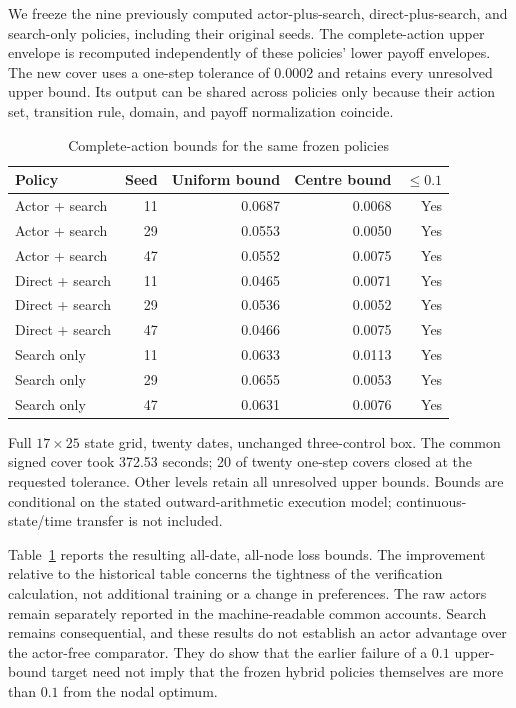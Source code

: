 \documentclass[ecta,nameyear,draft]{econsocart}
\theoremstyle{definition}
\theoremstyle{remark}
\begin{document}
We freeze the nine previously computed actor-plus-search, direct-plus-search, and search-only policies, including their original seeds. The complete-action upper envelope is recomputed independently of these policies' lower payoff envelopes. The new cover uses a one-step tolerance of $0.0002$ and retains every unresolved upper bound. Its output can be shared across policies only because their action set, transition rule, domain, and payoff normalization coincide.

\begin{table}[htbp]
\centering\small\setlength{\tabcolsep}{4pt}
\caption{Complete-action bounds for the same frozen policies}\label{tab:r9common}
\begin{tabular}{lrrrr}
\toprule
Policy & Seed & Uniform bound & Centre bound & $\leq0.1$ \\
\midrule
Actor + search & 11 & 0.0687 & 0.0068 & Yes \\
Actor + search & 29 & 0.0553 & 0.0050 & Yes \\
Actor + search & 47 & 0.0552 & 0.0075 & Yes \\
Direct + search & 11 & 0.0465 & 0.0071 & Yes \\
Direct + search & 29 & 0.0536 & 0.0052 & Yes \\
Direct + search & 47 & 0.0466 & 0.0075 & Yes \\
Search only & 11 & 0.0633 & 0.0113 & Yes \\
Search only & 29 & 0.0655 & 0.0053 & Yes \\
Search only & 47 & 0.0631 & 0.0076 & Yes \\
\bottomrule
\end{tabular}
\par\vspace{3pt}\begin{minipage}{0.97\linewidth}\footnotesize Full $17\times25$ state grid, twenty dates, unchanged three-control box. The common signed cover took 372.53 seconds; 20 of twenty one-step covers closed at the requested tolerance. Other levels retain all unresolved upper bounds. Bounds are conditional on the stated outward-arithmetic execution model; continuous-state/time transfer is not included.\end{minipage}
\end{table}


Table~\ref{tab:r9common} reports the resulting all-date, all-node loss bounds. The improvement relative to the historical table concerns the tightness of the verification calculation, not additional training or a change in preferences. The raw actors remain separately reported in the machine-readable common accounts. Search remains consequential, and these results do not establish an actor advantage over the actor-free comparator. They do show that the earlier failure of a $0.1$ upper-bound target need not imply that the frozen hybrid policies themselves are more than $0.1$ from the nodal optimum.
\end{document}
